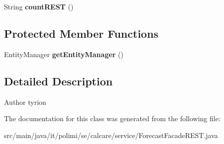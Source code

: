 \begin{DoxyCompactItemize}
\item 
\hypertarget{classit_1_1polimi_1_1se_1_1calcare_1_1service_1_1ForecastFacadeREST_afd00b4b31b45758d44b4426c895bdf7d}{}String {\bfseries count\+R\+E\+S\+T} ()\label{classit_1_1polimi_1_1se_1_1calcare_1_1service_1_1ForecastFacadeREST_afd00b4b31b45758d44b4426c895bdf7d}

\end{DoxyCompactItemize}
\subsection*{Protected Member Functions}
\begin{DoxyCompactItemize}
\item 
\hypertarget{classit_1_1polimi_1_1se_1_1calcare_1_1service_1_1ForecastFacadeREST_a54950bdac67672435d1c919ee939340c}{}Entity\+Manager {\bfseries get\+Entity\+Manager} ()\label{classit_1_1polimi_1_1se_1_1calcare_1_1service_1_1ForecastFacadeREST_a54950bdac67672435d1c919ee939340c}

\end{DoxyCompactItemize}


\subsection{Detailed Description}
\begin{DoxyAuthor}{Author}
tyrion 
\end{DoxyAuthor}


The documentation for this class was generated from the following file\+:\begin{DoxyCompactItemize}
\item 
src/main/java/it/polimi/se/calcare/service/Forecast\+Facade\+R\+E\+S\+T.\+java\end{DoxyCompactItemize}
